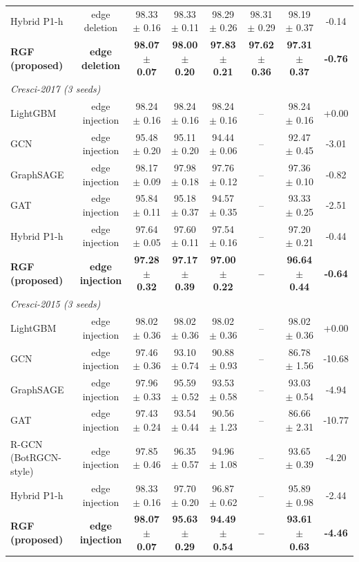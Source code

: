 \begin{table}[!t]
\begin{tabular}{lccccccc}
Hybrid P1-h & edge deletion & 98.33 $\pm$ 0.16 & 98.33 $\pm$ 0.11 & 98.29 $\pm$ 0.26 & 98.31 $\pm$ 0.29 & 98.19 $\pm$ 0.37 & -0.14 \\
\textbf{RGF (proposed)} & \textbf{edge deletion} & \textbf{98.07 $\pm$ 0.07} & \textbf{98.00 $\pm$ 0.20} & \textbf{97.83 $\pm$ 0.21} & \textbf{97.62 $\pm$ 0.36} & \textbf{97.31 $\pm$ 0.37} & \textbf{-0.76} \\
\multicolumn{8}{l}{\textit{Cresci-2017 (3 seeds)}} \\
LightGBM & edge injection & 98.24 $\pm$ 0.16 & 98.24 $\pm$ 0.16 & 98.24 $\pm$ 0.16 & -- & 98.24 $\pm$ 0.16 & +0.00 \\
GCN & edge injection & 95.48 $\pm$ 0.20 & 95.11 $\pm$ 0.20 & 94.44 $\pm$ 0.06 & -- & 92.47 $\pm$ 0.45 & -3.01 \\
GraphSAGE & edge injection & 98.17 $\pm$ 0.09 & 97.98 $\pm$ 0.18 & 97.76 $\pm$ 0.12 & -- & 97.36 $\pm$ 0.10 & -0.82 \\
GAT & edge injection & 95.84 $\pm$ 0.11 & 95.18 $\pm$ 0.37 & 94.57 $\pm$ 0.35 & -- & 93.33 $\pm$ 0.25 & -2.51 \\
Hybrid P1-h & edge injection & 97.64 $\pm$ 0.05 & 97.60 $\pm$ 0.11 & 97.54 $\pm$ 0.16 & -- & 97.20 $\pm$ 0.21 & -0.44 \\
\textbf{RGF (proposed)} & \textbf{edge injection} & \textbf{97.28 $\pm$ 0.32} & \textbf{97.17 $\pm$ 0.39} & \textbf{97.00 $\pm$ 0.22} & \textbf{--} & \textbf{96.64 $\pm$ 0.44} & \textbf{-0.64} \\
\multicolumn{8}{l}{\textit{Cresci-2015 (3 seeds)}} \\
LightGBM & edge injection & 98.02 $\pm$ 0.36 & 98.02 $\pm$ 0.36 & 98.02 $\pm$ 0.36 & -- & 98.02 $\pm$ 0.36 & +0.00 \\
GCN & edge injection & 97.46 $\pm$ 0.36 & 93.10 $\pm$ 0.74 & 90.88 $\pm$ 0.93 & -- & 86.78 $\pm$ 1.56 & -10.68 \\
GraphSAGE & edge injection & 97.96 $\pm$ 0.33 & 95.59 $\pm$ 0.52 & 93.53 $\pm$ 0.58 & -- & 93.03 $\pm$ 0.54 & -4.94 \\
GAT & edge injection & 97.43 $\pm$ 0.24 & 93.54 $\pm$ 0.44 & 90.56 $\pm$ 1.23 & -- & 86.66 $\pm$ 2.31 & -10.77 \\
R-GCN (BotRGCN-style) & edge injection & 97.85 $\pm$ 0.46 & 96.35 $\pm$ 0.57 & 94.96 $\pm$ 1.08 & -- & 93.65 $\pm$ 0.39 & -4.20 \\
Hybrid P1-h & edge injection & 98.33 $\pm$ 0.16 & 97.70 $\pm$ 0.20 & 96.87 $\pm$ 0.62 & -- & 95.89 $\pm$ 0.98 & -2.44 \\
\textbf{RGF (proposed)} & \textbf{edge injection} & \textbf{98.07 $\pm$ 0.07} & \textbf{95.63 $\pm$ 0.29} & \textbf{94.49 $\pm$ 0.54} & \textbf{--} & \textbf{93.61 $\pm$ 0.63} & \textbf{-4.46} \\

\end{tabular}
\end{table}
